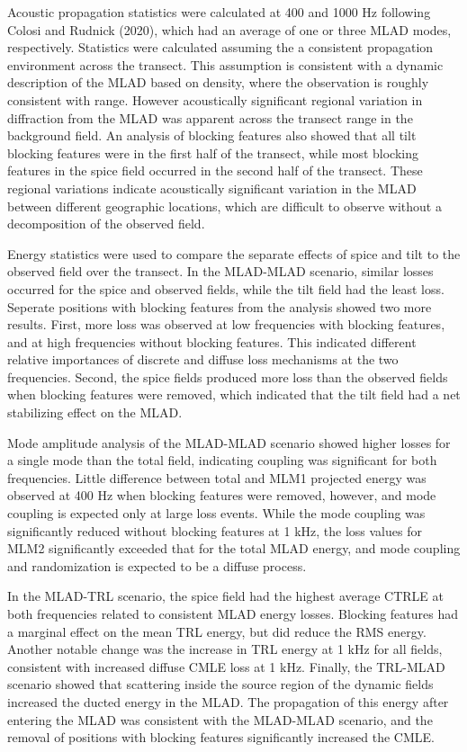 \documentclass[preprint,NumberedRefs]{JASA}
\begin{document}
Acoustic propagation statistics were calculated at 400 and 1000 Hz following Colosi and Rudnick (2020),\cite{colosi2020observations} which had an average of one or three MLAD modes, respectively. Statistics were calculated assuming the a consistent propagation environment across the transect. This assumption is consistent with a dynamic description of the MLAD based on density,\citep{cole2010seasonal} where the observation is roughly consistent with range. However acoustically significant regional variation in diffraction from the MLAD was apparent across the transect range in the background field. An analysis of blocking features also showed that all tilt blocking features were in the first half of the transect, while most blocking features in the spice field occurred in the second half of the transect. These regional variations indicate acoustically significant variation in the MLAD between different geographic locations, which are difficult to observe without a decomposition of the observed field.

Energy statistics were used to compare the separate effects of spice and tilt to the observed field over the transect. In the MLAD-MLAD scenario, similar losses occurred for the spice and observed fields, while the tilt field had the least loss. Seperate positions with blocking features from the analysis showed two more results. First, more loss was observed at low frequencies with blocking features, and at high frequencies without blocking features. This indicated different relative importances of discrete and diffuse loss mechanisms at the two frequencies. Second, the spice fields produced more loss than the observed fields when blocking features were removed, which indicated that the tilt field had a net stabilizing effect on the MLAD.

Mode amplitude analysis of the MLAD-MLAD scenario showed higher losses for a single mode than the total field, indicating coupling was significant for both frequencies. Little difference between total and MLM1 projected energy was observed at 400 Hz when blocking features were removed, however, and mode coupling is expected only at large loss events. While the mode coupling was significantly reduced without blocking features at 1 kHz, the loss values for MLM2 significantly exceeded that for the total MLAD energy, and mode coupling and randomization is expected to be a diffuse process.

In the MLAD-TRL scenario, the spice field had the highest average CTRLE at both frequencies related to consistent MLAD energy losses. Blocking features had a marginal effect on the mean TRL energy, but did reduce the RMS energy. Another notable change was the increase in TRL energy at 1 kHz for all fields, consistent with increased diffuse CMLE loss at 1 kHz. Finally, the TRL-MLAD scenario showed that scattering inside the source region of the dynamic fields increased the ducted energy in the MLAD. The propagation of this energy after entering the MLAD was consistent with the MLAD-MLAD scenario, and the removal of positions with blocking features significantly increased the CMLE.
\end{document}
